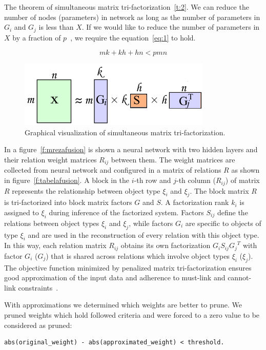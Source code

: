 \documentclass{article} %
\begin{document}
The theorem of simultaneous matrix tri-factorization~\ref{t:2}. We can reduce the number of nodes (parameters) in network as long as the number of parameters in $G_i$ and $G_j$ is less than $X$. If we would like to reduce the number of parameters in $X$ by a fraction of $p$~\cite{sainath2013low}, we require the equation~\ref{eq:1} to hold.

\begin{equation} \label{eq:1}
 mk + kh + hn < pmn
\end{equation}


\begin{figure}[!ht]
\centering 
\includegraphics[width=.5\textwidth]{mf2.png}
\caption{Graphical visualization of simultaneous matrix tri-factorization.}
\label{f:mf2}
\end{figure}


\newpage

In a figure~\ref{f:mrezafusion} is shown a neural network with two hidden layers 
and their relation weight matrices $R_{ij}$ between them. The weight matrices are collected 
from neural network and configured in a matrix of relations $R$ as shown in 
figure~\ref{f:tabelafusion}. A block in the $i$-th row and $j$-th column ($R_{ij}$) of matrix $R$ represents the relationship between object type $\xi_i$ and $\xi_j$. The block matrix $R$ is tri-factorized into block matrix factors $G$ and $S$. A factorization rank $k_i$ is assigned to $\xi_i$ during inference of the factorized system. Factors $S_{ij}$ define the relations between object types $\xi_i$ and $\xi_j$, while factors $G_i$ are specific to objects of type $\xi_i$ and are used in the reconstruction of every relation with  this object type. In this way, each relation matrix $R_{ij}$ obtains its own factorization $G_i S_{ij} {G_j}^T$ with factor $G_i$ ($G_j$) that is shared across relations which involve object types $\xi_i$ ($\xi_j$). The objective function minimized by penalized matrix
tri-factorization ensures good approximation of the input
data and adherence to must-link and cannot-link
constraints~\cite{zitnik2015data}.

With approximations we determined which weights are better to prune.
We pruned weights which hold followed criteria and were forced to a zero value to be considered as pruned:
\begin{lstlisting}
abs(original_weight) - abs(approximated_weight) < threshold.
\end{lstlisting}
\end{document}
